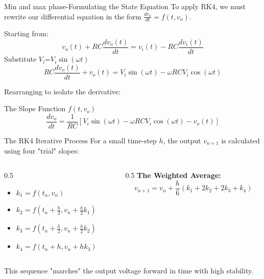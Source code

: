 \documentclass{beamer}
\begin{document}
\begin{frame}{Min and max phase-Formulating the State Equation}
    To apply RK4, we must rewrite our differential equation in the form $\frac{dv_o}{dt} = f(t, v_o)$.
    \par\vspace{0.3cm}
    Starting from:
    $$v_o(t) + RC \frac{dv_o(t)}{dt} = v_i(t) - RC \frac{dv_i(t)}{dt}$$
Substitute $V_i$=$V_i\sin(\omega t)$
    $$RC \frac{dv_o(t)}{dt} + v_o(t) = V_i \sin(\omega t) - \omega RC V_i \cos(\omega t)$$
    \par\vspace{0.3cm}
    Rearranging to isolate the derivative:
    \begin{block}{The Slope Function $f(t, v_o)$}
        $$\frac{dv_o}{dt} = \frac{1}{RC} \left[ V_i \sin(\omega t) - \omega RC V_i \cos(\omega t) - v_o(t) \right]$$
    \end{block}
\end{frame}

\begin{frame}{ The RK4 Iterative Process}
    For a small time-step $h$, the output $v_{n+1}$ is calculated using four "trial" slopes:
    \par\vspace{0.2cm}
    \begin{columns}
        \begin{column}{0.5\textwidth}
            \begin{itemize}
                \item $k_1 = f(t_n, v_n)$
                \item $k_2 = f(t_n + \frac{h}{2}, v_n + \frac{h}{2}k_1)$
                \item $k_3 = f(t_n + \frac{h}{2}, v_n + \frac{h}{2}k_2)$
                \item $k_4 = f(t_n + h, v_n + hk_3)$
            \end{itemize}
        \end{column}
        \begin{column}{0.5\textwidth}
            \textbf{The Weighted Average:}
            $$v_{n+1} = v_n + \frac{h}{6}(k_1 + 2k_2 + 2k_3 + k_4)$$
        \end{column}
    \end{columns}
    \par\vspace{0.4cm}
    This sequence "marches" the output voltage forward in time with high stability.
\end{frame}
\end{document}
